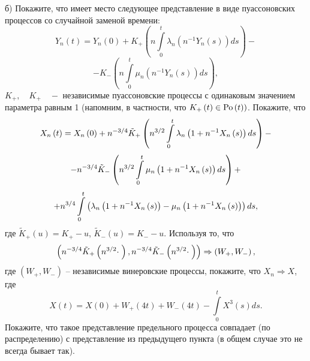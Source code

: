 \begin{problem}
б) Покажите, что имеет место следующее представление в виде 
пуассоновских процессов со случайной заменой времени: 
\[
Y_n \left( t \right)=Y_n \left( 0 \right)+K_+ \left( {n\int\limits_0^t 
{\lambda _n \left( {n^{-1}Y_n \left( s \right)} \right)ds} } \right)- 
\]
\[-K_- 
\left( {n\int\limits_0^t {\mu _n \left( {n^{-1}Y_n \left( s \right)} 
\right)ds} } \right),
\]
$K_+ ,
\quad
K_+ \quad -$ независимые пуассоновские процессы с одинаковым значением 
параметра равным 1 (напомним, в частности, что $K_+ \left( t \right)\in 
\mathrm{Po}\left( t \right))$. Покажите, что
\[
X_n \left( t \right)=X_n \left( 0 \right)+n^{-3 \mathord{\left/ {\vphantom 
{3 4}} \right. \kern-\nulldelimiterspace} 4}\tilde {K}_+ \left( {n^{3 
\mathord{\left/ {\vphantom {3 2}} \right. \kern-\nulldelimiterspace} 
2}\int\limits_0^t {\lambda _n \left( {1+n^{-1}X_n \left( s \right)} 
\right)ds} } \right)-
\]
\[
-n^{-3 \mathord{\left/ {\vphantom {3 4}} \right. \kern-\nulldelimiterspace} 
4}\tilde {K}_- \left( {n^{3 \mathord{\left/ {\vphantom {3 2}} \right. 
\kern-\nulldelimiterspace} 2}\int\limits_0^t {\mu _n \left( {1+n^{-1}X_n 
\left( s \right)} \right)ds} } \right)+
\]
\[+n^{3 \mathord{\left/ {\vphantom {3 
4}} \right. \kern-\nulldelimiterspace} 4}\int\limits_0^t {\left( {\lambda _n 
\left( {1+n^{-1}X_n \left( s \right)} \right)-\mu _n \left( {1+n^{-1}X_n 
\left( s \right)} \right)} \right)ds} ,
\]
где $\tilde {K}_+ \left( u \right)=K_+ -u$, $\tilde {K}_- \left( u 
\right)=K_- -u$. Используя то, что
\[
\left( {n^{-3 \mathord{\left/ {\vphantom {3 4}} \right. 
\kern-\nulldelimiterspace} 4}\tilde {K}_+ \left( {n^{3 \mathord{\left/ 
{\vphantom {3 2}} \right. \kern-\nulldelimiterspace} 2}\cdot \;} 
\right),n^{-3 \mathord{\left/ {\vphantom {3 4}} \right. 
\kern-\nulldelimiterspace} 4}\tilde {K}_- \left( {n^{3 \mathord{\left/ 
{\vphantom {3 2}} \right. \kern-\nulldelimiterspace} 2}\cdot \;} \right)} 
\right)\Rightarrow \left( {W_+ ,W_- } \right),
\]
где $\left( {W_+ ,W_- } \right)$ -- независимые винеровские процессы, 
покажите, что $X_n \Rightarrow X$, где 
\[
X\left( t \right)=X\left( 0 \right)+W_+ \left( {4t} \right)+W_- \left( {4t} 
\right)-\int\limits_0^t {X^3\left( s \right)ds} .
\]
Покажите, что такое представление предельного процесса совпадает (по 
распределению) с представление из предыдущего пункта (в общем случае это не 
всегда бывает так).

\end{problem}

